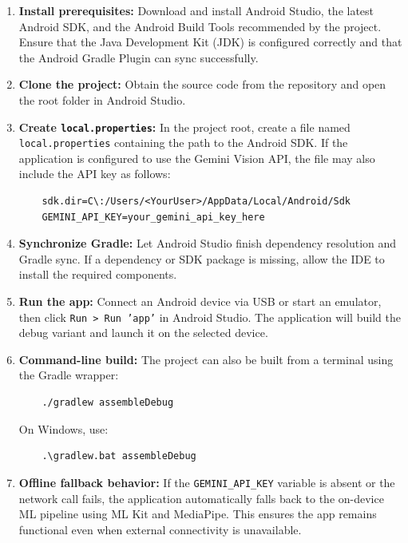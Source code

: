 \begin{enumerate}
    \item \textbf{Install prerequisites:} Download and install Android Studio, the latest Android SDK, and the Android Build Tools recommended by the project. Ensure that the Java Development Kit (JDK) is configured correctly and that the Android Gradle Plugin can sync successfully.
    \item \textbf{Clone the project:} Obtain the source code from the repository and open the root folder in Android Studio.
    \item \textbf{Create \texttt{local.properties}:} In the project root, create a file named \texttt{local.properties} containing the path to the Android SDK. If the application is configured to use the Gemini Vision API, the file may also include the API key as follows:

    \begin{lstlisting}
    sdk.dir=C\:/Users/<YourUser>/AppData/Local/Android/Sdk
    GEMINI_API_KEY=your_gemini_api_key_here
    \end{lstlisting}

    \item \textbf{Synchronize Gradle:} Let Android Studio finish dependency resolution and Gradle sync. If a dependency or SDK package is missing, allow the IDE to install the required components.
    \item \textbf{Run the app:} Connect an Android device via USB or start an emulator, then click \texttt{Run > Run 'app'} in Android Studio. The application will build the debug variant and launch it on the selected device.
    \item \textbf{Command-line build:} The project can also be built from a terminal using the Gradle wrapper:

    \begin{lstlisting}
    ./gradlew assembleDebug
    \end{lstlisting}

    On Windows, use:

    \begin{lstlisting}
    .\gradlew.bat assembleDebug
    \end{lstlisting}

    \item \textbf{Offline fallback behavior:} If the \texttt{GEMINI\_API\_KEY} variable is absent or the network call fails, the application automatically falls back to the on-device ML pipeline using ML Kit and MediaPipe. This ensures the app remains functional even when external connectivity is unavailable.
\end{enumerate}


